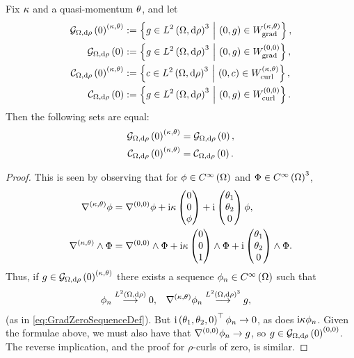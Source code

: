 \begin{prop} \label{prop:ZeroInvariantUnderQM-Wavenumber}
	Fix $\wavenumber$ and a quasi-momentum $\qm$, and let
	\begin{align*}
		\gradZero{\ddom}{\rho}^{\kt} &:= \clbracs{ g\in \ltwo{\ddom}{\rho}^3 \setVert \bracs{0,g}\in W^{\kt}_\mathrm{grad} }, \\
		\gradZero{\ddom}{\rho} &:= \clbracs{ g\in \ltwo{\ddom}{\rho}^3 \setVert \bracs{0,g}\in W^{\bracs{0, 0}}_\mathrm{grad} }, \\
		\curlZero{\ddom}{\rho}^{\kt} &:= \clbracs{ c\in \ltwo{\ddom}{\rho}^3 \setVert \bracs{0,c}\in W^{\kt}_\mathrm{curl} }, \\
		\curlZero{\ddom}{\rho} &:= \clbracs{ g\in \ltwo{\ddom}{\rho}^3 \setVert \bracs{0,g}\in W^{\bracs{0, 0}}_\mathrm{curl} }.
	\end{align*}
	Then the following sets are equal:
	\begin{align*}
		\gradZero{\ddom}{\rho}^{\kt} &= \gradZero{\ddom}{\rho}, \\
		\curlZero{\ddom}{\rho}^{\kt} &= \curlZero{\ddom}{\rho}.
	\end{align*}
\end{prop}
\begin{proof}
	This is seen by observing that for $\phi\in\smooth{\ddom}$ and $\Phi\in\smooth{\ddom}^3$,
	\begin{align*}
		\grad^{\kt}\phi &= \grad^{\bracs{0, 0}}\phi + \rmi\wavenumber\begin{pmatrix} 0 \\ 0 \\ \phi \end{pmatrix} + \rmi\begin{pmatrix} \qm_1 \\ \qm_2 \\ 0 \end{pmatrix}\phi, \\
		\grad^{\kt}\wedge\Phi &= \grad^{\bracs{0, 0}}\wedge\Phi + \rmi\wavenumber\begin{pmatrix} 0 \\ 0 \\ 1 \end{pmatrix}\wedge\Phi + \rmi\begin{pmatrix} \qm_1 \\ \qm_2 \\ 0 \end{pmatrix} \wedge \Phi.
	\end{align*}
	Thus, if $g\in \gradZero{\ddom}{\rho}^{\kt}$ there exists a sequence $\phi_n\in\smooth{\ddom}$ such that
	\begin{align*}
		\phi_n \lconv{\ltwo{\ddom}{\rho}} 0, &\quad \ktgrad\phi_n \lconv{ \ltwo{\ddom}{\rho}^3 } g,
	\end{align*}
	(as in \eqref{eq:GradZeroSequenceDef}).
	But $\rmi\bracs{\qm_1, \qm_2, 0}^{\top}\phi_n\rightarrow 0$, as does $\rmi\wavenumber\phi_n$.
	Given the formulae above, we must also have that $\grad^{\bracs{0, 0}}\phi_n\rightarrow g$, so $g\in \gradZero{\ddom}{\rho}^{\bracs{0, 0}}$.
	The reverse implication, and the proof for $\rho$-curls of zero, is similar.
\end{proof}

